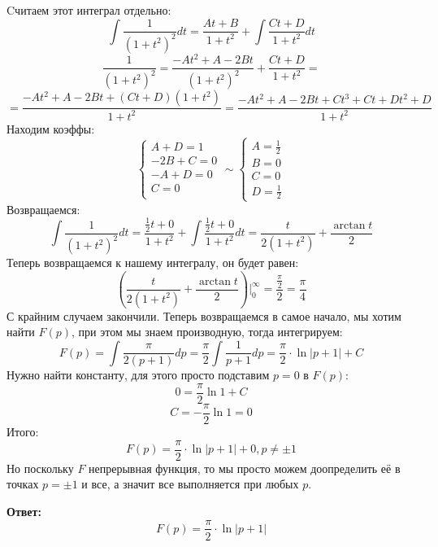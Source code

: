 \documentclass[a4paper,12pt]{article}
\begin{document}
Cчитаем этот интеграл отдельно:
\[
\int \frac{1}{(1 + t^2)^2} dt = \frac{At + B}{1 + t^2} + \int \frac{Ct + D}{1+t^2} dt
\]
\[
\frac{1}{(1 + t^2)^2} = \frac{-At^2 + A - 2Bt}{(1 + t^2)^2} + \frac{Ct + D}{1 + t^2} = 
\]
\[
=
 \frac{-At^2 + A - 2Bt +(Ct+D)(1 + t^2)}{1 + t^2} = \frac{-At^2 + A - 2Bt + Ct^3 + Ct + Dt^2 + D}{1+t^2}
\]
Находим коэффы:
\[
\begin{cases}
A + D = 1\\
-2B + C = 0 \\
-A + D= 0 \\
C = 0 \\
\end{cases}
\sim
\begin{cases}
A = \frac12 \\
B = 0\\
C = 0 \\
D = \frac12 
\end{cases}
\]
Возвращаемся:
\[
\int \frac{1}{(1 + t^2)^2} dt = \frac{\frac{1}{2}t + 0}{1 + t^2} + \int \frac{\frac{1}{2}t + 0}{1+t^2}dt = 
\frac{t}{2(1+t^2)} + \frac{\arctan t}{2} 
\]
Теперь возвращаемся к нашему интегралу, он будет равен:
\[
\left( \frac{t}{2(1+t^2)} + \frac{\arctan t}{2}  \right) \Bigg|_0^{\infty} = \frac{\frac{\pi}{2}}{2} = \frac{\pi}{4}
\]
С крайним случаем закончили. Теперь возвращаемся в самое начало, мы хотим найти $F(p)$, при этом мы знаем производную, тогда интегрируем:
\[
F(p) = \int \frac{\pi}{2(p + 1)} dp = \frac{\pi}{2} \int \frac{1}{p + 1} dp = \frac{\pi}{2} \cdot \ln |p + 1| + C
\]
Нужно найти константу, для этого просто подставим $p =0 $ в $F(p)$:
\[
0 = \frac{\pi}{2} \ln1 + C
\]
\[
C = -\frac{\pi}{2} \ln 1 = 0
\]
Итого:
\[
F(p) = \frac{\pi}{2} \cdot \ln |p + 1| + 0, p \neq \pm 1
\]
Но поскольку $F$ непрерывная функция, то мы просто можем доопределить её в точках $p = \pm 1$ и все, а значит все выполняется при любых $p$.
\begin{center}
\textbf{Ответ: }
\[
F(p) = \frac{\pi}{2} \cdot \ln |p + 1|
\]
\end{center}
\end{document}
